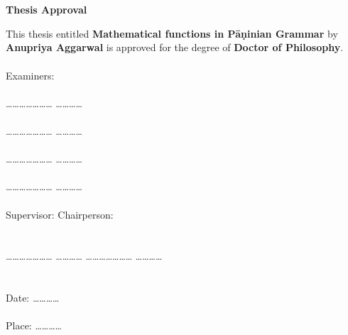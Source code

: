 \chapter*{}
\thispagestyle{empty}
\vspace{-1in}
\begin{center}
{\Large  {\bf Thesis Approval}}
\end{center}

\vspace*{0.1in} \noindent This thesis entitled {\large \bf Mathematical functions in Pāṇinian Grammar} by {\bf \large
Anupriya Aggarwal} is approved for the degree of  {\large \bf Doctor of Philosophy}.\\\\
\hspace*{4 in} Examiners:\\\\
\hspace*{3.5 in} \ldots\ldots \ldots \ldots \ldots \ldots\ldots
\ldots \ldots \ldots\ldots\\\\
\hspace*{3.5 in} \ldots\ldots \ldots \ldots \ldots \ldots\ldots
\ldots \ldots \ldots\ldots\\\\
\hspace*{3.5 in} \ldots\ldots \ldots \ldots \ldots \ldots\ldots
\ldots \ldots \ldots\ldots\\\\
\hspace*{3.5in} \ldots\ldots \ldots \ldots \ldots \ldots\ldots
\ldots \ldots \ldots\ldots\\\\
 Supervisor:\hspace*{3.5 in}  Chairperson:\\\\\\
\ldots\ldots \ldots \ldots \ldots \ldots\ldots
\ldots \ldots \ldots\ldots
\hspace*{1.0 in} \ldots\ldots \ldots \ldots \ldots \ldots\ldots
\ldots \ldots \ldots\ldots\\\\\\

\noindent
Date: \ldots\ldots \ldots \ldots\\\\
Place: \ldots\ldots \ldots \ldots
